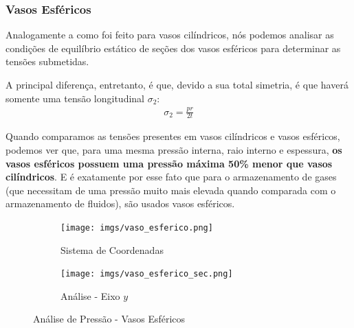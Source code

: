 \documentclass{article}
\begin{document}
\subsubsection{Vasos Esféricos}
Analogamente a como foi feito para vasos cilíndricos, nós podemos analisar as condições de equilíbrio estático de seções dos vasos esféricos para determinar as tensões submetidas. 

A principal diferença, entretanto, é que, devido a sua total simetria, é que haverá somente uma tensão longitudinal $\sigma_2$:
\begin{align}
    \sigma_2 = \frac{pr}{2t}
\end{align}

Quando comparamos as tensões presentes em vasos cilíndricos e vasos esféricos, podemos ver que, para uma mesma pressão interna, raio interno e espessura, \textbf{os vasos esféricos possuem uma pressão máxima 50\% menor que vasos cilíndricos}. E é exatamente por esse fato que para o armazenamento de gases (que necessitam de uma pressão muito mais elevada quando comparada com o armazenamento de fluidos), são usados vasos esféricos.
\begin{figure}[h]

    \centering
    \begin{subfigure}[t]{.45\textwidth}
        \centering
        \texttt{[image: imgs/vaso\_esferico.png]}
        \caption{Sistema de Coordenadas}
        \label{fig:vaso_c_eixo_x}
    \end{subfigure}
    \begin{subfigure}[t]{0.45\textwidth}
        \centering
        \texttt{[image: imgs/vaso\_esferico\_sec.png]}
        \caption{Análise - Eixo $y$}
        \label{fig:vaso_c_eixo_y}
    \end{subfigure}
    \caption{Análise de Pressão - Vasos Esféricos}
\end{figure}
\end{document}
